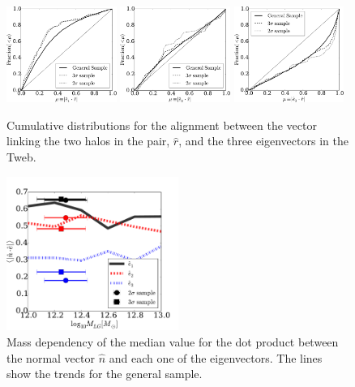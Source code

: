\documentclass{emulateapj}
\begin{document}
\begin{figure}
\begin{center}
  \includegraphics[width=0.32\textwidth]{fig4a.pdf}
  \includegraphics[width=0.32\textwidth]{fig4b.pdf}
  \includegraphics[width=0.32\textwidth]{fig4c.pdf}
\end{center}
\caption{Cumulative distributions for the alignment between the vector
  linking the two halos in the pair, $\hat{r}$, and the three
  eigenvectors in the Tweb.
    \label{fig:alignment_r}}  
\end{figure}


\begin{figure}
\begin{center}
  \includegraphics[width=0.50\textwidth]{fig5.pdf}
\caption{Mass dependency of the median value for the dot product
  between the normal vector $\hat{n}$ and each one of the
  eigenvectors.  The lines show the trends for the general sample.
\label{fig:median_alignment_n}}
\end{center}
\end{figure}
\end{document}
